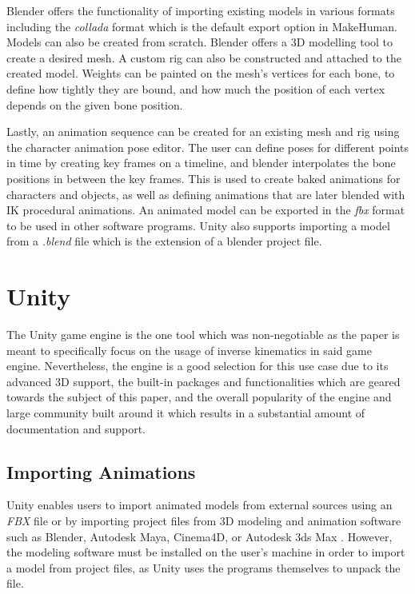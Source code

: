 
Blender offers the functionality of importing existing models in various formats
including the \textit{collada} format \cite{collada} which is the default export
option in MakeHuman. Models can also be created from scratch. Blender offers
a 3D modelling tool to create a desired mesh. A custom rig can also be
constructed and attached to the created model. Weights can be painted on the
mesh's vertices for each bone, to define how tightly they are bound, and how
much the position of each vertex depends on the given bone position. 

Lastly, an animation sequence can be created for an existing mesh and rig using
the character animation pose editor. The user can define poses for different
points in time by creating key frames on a timeline, and blender interpolates the
bone positions in between the key frames. This is used to create baked animations
for characters and objects, as well as defining animations that are later
blended with IK procedural animations. An animated model can be exported in the
\textit{fbx} format to be used in other software programs. Unity also supports
importing a model from a \textit{.blend} file which is the extension of
a blender project file. 


\section{Unity}
The Unity game engine is the one tool which was non-negotiable as the paper
is meant to specifically focus on the usage of inverse kinematics in said game
engine. Nevertheless, the engine is a good selection for this use case due to
its advanced 3D support, the built-in packages and functionalities which are
geared towards the subject of this paper, and the overall popularity of the
engine and large community built around it which results in a substantial amount
of documentation and support. 

\subsection{Importing Animations}
Unity enables users to import animated models from external sources using an
\textit{FBX} file or by importing project files from 3D modeling and animation
software such as Blender, Autodesk Maya, Cinema4D, or Autodesk 3ds Max
\cite{unity_import}. However, the modeling software must be installed on the
user's machine in order to import a model from project files, as Unity uses the
programs themselves to unpack the file. 

